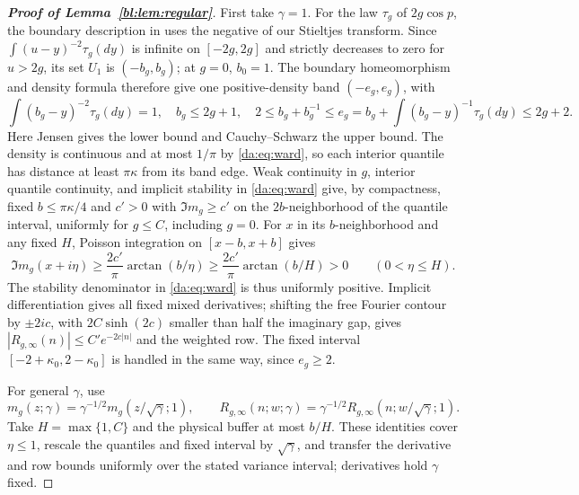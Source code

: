 \documentclass[11pt]{article}
\numberwithin{equation}{section}
\theoremstyle{remark}
\begin{document}
\begin{proof}[\textbf{Proof of Lemma~\ref{bl:lem:regular}}]
First take $\gamma=1$. For the law $\tau_g$ of $2g\cos p$,
the boundary description in
\cite[Lemmas 2--4, Proposition 2 and Corollary 3, pp. 709--711]{Biane}
uses the negative of our Stieltjes transform. Since
$\int(u-y)^{-2}\tau_g(dy)$ is infinite on $[-2g,2g]$ and strictly
decreases to zero for $u>2g$, its set $U_1$ is $(-b_g,b_g)$;
at $g=0$, $b_0=1$. The boundary homeomorphism and density formula
therefore give one positive-density band $(-e_g,e_g)$, with
\[
 \int(b_g-y)^{-2}\tau_g(dy)=1,\quad b_g\le2g+1,\quad
 2\le b_g+b_g^{-1}\le e_g
 =b_g+\int(b_g-y)^{-1}\tau_g(dy)\le2g+2.
\]
Here Jensen gives the lower bound and Cauchy--Schwarz the upper bound.
The density is continuous and at most $1/\pi$ by \eqref{da:eq:ward},
so each interior quantile has distance at least $\pi\kappa$ from its
band edge. Weak continuity in $g$, interior quantile continuity, and
implicit stability in \eqref{da:eq:ward} give, by compactness, fixed
$b\le\pi\kappa/4$ and $c'>0$ with $\Im m_g\ge c'$ on the
$2b$-neighborhood of the quantile interval, uniformly for $g\le C$,
including $g=0$. For $x$ in its $b$-neighborhood and any fixed $H$,
Poisson integration on $[x-b,x+b]$ gives
\[
 \Im m_g(x+i\eta)\ge\frac{2c'}\pi\arctan(b/\eta)
 \ge\frac{2c'}\pi\arctan(b/H)>0\qquad(0<\eta\le H).
\]
The stability denominator in \eqref{da:eq:ward} is thus uniformly
positive. Implicit differentiation gives all fixed mixed derivatives;
shifting the free Fourier contour by $\pm2ic$, with
$2C\sinh(2c)$ smaller than half the imaginary gap, gives
$|R_{g,\infty}(n)|\le C'e^{-2c|n|}$ and the weighted row.
The fixed interval $[-2+\kappa_0,2-\kappa_0]$ is handled in the
same way, since $e_g\ge2$.

For general $\gamma$, use
\[
 m_g(z;\gamma)=\gamma^{-1/2}m_g(z/\sqrt\gamma;1),\qquad
 R_{g,\infty}(n;w;\gamma)
 =\gamma^{-1/2}R_{g,\infty}(n;w/\sqrt\gamma;1).
\]
Take $H=\max\{1,C\}$ and the physical buffer at most $b/H$.
These identities cover $\eta\le1$, rescale the quantiles and fixed
interval by $\sqrt\gamma$, and transfer the derivative and row bounds
uniformly over the stated variance interval; derivatives hold $\gamma$ fixed.
\end{proof}
\end{document}
